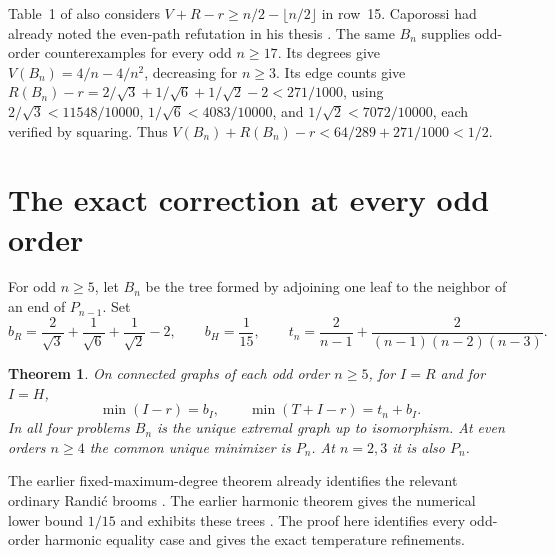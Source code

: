 \documentclass[11pt,a4paper]{article}
\newtheorem{theorem}{Theorem}[section]
\begin{document}
Table~1 of \cite{cat-agx2004} also considers
$V+R-r\ge n/2-\lfloor n/2\rfloor$ in row~15. Caporossi had already
noted the even-path refutation in his thesis
\cite[p.~35, Conjecture~7]{cat-thesis}. The same $B_n$ supplies
odd-order counterexamples for every odd $n\ge17$. Its degrees give
$V(B_n)=4/n-4/n^2$, decreasing for $n\ge3$. Its edge counts give
$R(B_n)-r=2/\sqrt3+1/\sqrt6+1/\sqrt2-2<271/1000$,
using $2/\sqrt3<11548/10000$, $1/\sqrt6<4083/10000$, and
$1/\sqrt2<7072/10000$, each verified by squaring. Thus $V(B_n)+R(B_n)-r<64/289+271/1000<1/2$.

\section{The exact correction at every odd order}
\label{sec:odd-fork}
For odd $n\ge5$, let $B_n$ be the tree formed by adjoining one leaf
to the neighbor of an end of $P_{n-1}$. Set
\[
 b_R=\frac2{\sqrt3}+\frac1{\sqrt6}+\frac1{\sqrt2}-2,
 \qquad b_H=\frac1{15},\qquad
 t_n=\frac2{n-1}+\frac2{(n-1)(n-2)(n-3)}.
\]
\begin{theorem}\label{thm:odd-fork}
On connected graphs of each odd order $n\ge5$, for $I=R$ and for $I=H$,
\[
       \min (I-r)=b_I,\qquad
       \min (T+I-r)=t_n+b_I .
\]
In all four problems $B_n$ is the unique extremal graph up to isomorphism.
At even orders $n\ge4$ the common unique minimizer is $P_n$.
At $n=2,3$ it is also $P_n$.
\end{theorem}
The earlier fixed-maximum-degree theorem already identifies the relevant
ordinary Randi\'c brooms \cite[paper 05, Section~on the sharp radius bound]{fork-collected}.
The earlier harmonic theorem gives the numerical lower bound $1/15$ and
exhibits these trees \cite{cat-harm}. The proof here identifies every
odd-order harmonic equality case and gives the exact temperature refinements.
\end{document}
